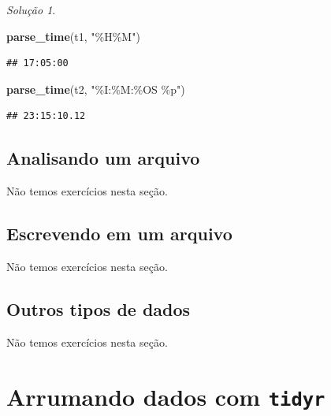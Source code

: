 \documentclass[
]{latex/krantz}
\newenvironment{Shaded}{\begin{snugshade}}{\end{snugshade}}
\newcommand{\FunctionTok}[1]{\textcolor[rgb]{0.13,0.29,0.53}{\textbf{#1}}}
\newcommand{\NormalTok}[1]{#1}
\newcommand{\StringTok}[1]{\textcolor[rgb]{0.31,0.60,0.02}{#1}}
\theoremstyle{definition}
\theoremstyle{definition}
\theoremstyle{definition}
\theoremstyle{definition}
\theoremstyle{remark}
\newtheorem*{solution}{Solução}
\begin{document}
\begin{solution}
\begin{Shaded}
\begin{Highlighting}[]
\FunctionTok{parse\_time}\NormalTok{(t1, }\StringTok{"\%H\%M"}\NormalTok{)}
\end{Highlighting}
\end{Shaded}

\begin{verbatim}
## 17:05:00
\end{verbatim}

\begin{Shaded}
\begin{Highlighting}[]
\FunctionTok{parse\_time}\NormalTok{(t2, }\StringTok{"\%I:\%M:\%OS \%p"}\NormalTok{)}
\end{Highlighting}
\end{Shaded}

\begin{verbatim}
## 23:15:10.12
\end{verbatim}

\end{solution}

\hypertarget{analisando-um-arquivo}{%
\section{Analisando um arquivo}\label{analisando-um-arquivo}}

Não temos exercícios nesta seção.

\hypertarget{escrevendo-em-um-arquivo}{%
\section{Escrevendo em um arquivo}\label{escrevendo-em-um-arquivo}}

Não temos exercícios nesta seção.

\hypertarget{outros-tipos-de-dados}{%
\section{Outros tipos de dados}\label{outros-tipos-de-dados}}

Não temos exercícios nesta seção.

\hypertarget{arrumando-dados-com-tidyr}{%
\chapter{\texorpdfstring{Arrumando dados com \texttt{tidyr}}{Arrumando dados com tidyr}}\label{arrumando-dados-com-tidyr}}
\end{document}
